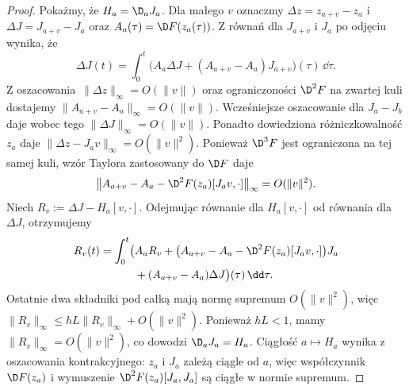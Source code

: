 \begin{proof}
Pokażmy, że $H_a=\D_aJ_a$. Dla małego $v$ oznaczmy
$\Delta z=z_{a+v}-z_a$ i $\Delta J=J_{a+v}-J_a$ oraz
$A_a(\tau)=\D F(z_a(\tau))$. Z równań dla $J_{a+v}$ i $J_a$
po odjęciu wynika, że
\[
\Delta J(t)=\int_0^t\bigl(A_a\Delta J
 +(A_{a+v}-A_a)J_{a+v}\bigr)(\tau)\,\dd\tau.
\]
Z oszacowania~$\|\Delta z\|_\infty=O(\|v\|)$ oraz
ograniczoności $\D^2F$ na zwartej kuli dostajemy
$\|A_{a+v}-A_a\|_\infty=O(\|v\|)$.
Wcześniejsze oszacowanie dla $J_a-J_b$ daje wobec tego
$\|\Delta J\|_\infty=O(\|v\|)$.
Ponadto dowiedziona różniczkowalność $z_a$ daje
$\|\Delta z-J_av\|_\infty=O(\|v\|^2)$.
Ponieważ $\D^3F$ jest ograniczona na tej samej kuli,
wzór Taylora zastosowany do $\D F$ daje
\[
\bigl\|A_{a+v}-A_a
 -\D^2F(z_a)[J_av,\cdot]\bigr\|_\infty
 =O(\|v\|^2).
\]
Niech $R_v:=\Delta J-H_a[v,\cdot]$.
Odejmując równanie dla $H_a[v,\cdot]$ od równania dla $\Delta J$,
otrzymujemy
\begin{align*}
R_v(t)=\int_0^t\bigl(&A_aR_v
 +\bigl(A_{a+v}-A_a-\D^2F(z_a)[J_av,\cdot]\bigr)J_a\\
 &+(A_{a+v}-A_a)\Delta J\bigr)(\tau)\,\dd\tau.
\end{align*}
Ostatnie dwa składniki pod całką mają normę supremum
$O(\|v\|^2)$, więc
$\|R_v\|_\infty\leq hL\|R_v\|_\infty+O(\|v\|^2)$.
Ponieważ $hL<1$, mamy $\|R_v\|_\infty=O(\|v\|^2)$,
co dowodzi $\D_aJ_a=H_a$.
Ciągłość $a\mapsto H_a$ wynika z oszacowania kontrakcyjnego:
$z_a$ i $J_a$ zależą ciągle od $a$, więc współczynnik
$\D F(z_a)$ i wymuszenie $\D^2F(z_a)[J_a,J_a]$ są
ciągłe w normie supremum.


\end{proof}
